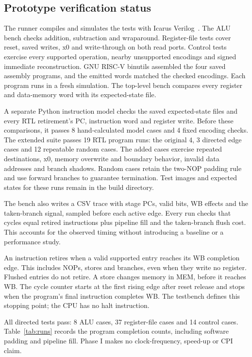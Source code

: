 \documentclass[conference]{IEEEtran}
\begin{document}
\subsection{Prototype verification status}
The runner compiles and simulates the tests with Icarus Verilog~\cite{icarus}. The ALU bench checks addition, subtraction and wraparound. Register-file tests cover reset, saved writes, x0 and write-through on both read ports. Control tests exercise every supported operation, nearby unsupported encodings and signed immediate reconstruction. GNU RISC-V binutils assembled the four saved assembly programs, and the emitted words matched the checked encodings. Each program runs in a fresh simulation. The top-level bench compares every register and data-memory word with its expected-state file.

A separate Python instruction model checks the saved expected-state files and every RTL retirement's PC, instruction word and register write. Before these comparisons, it passes 8 hand-calculated model cases and 4 fixed encoding checks. The extended suite passes 19 RTL program runs: the original 4, 3 directed edge cases and 12 repeatable random cases. The added cases exercise repeated destinations, x0, memory overwrite and boundary behavior, invalid data addresses and branch shadows. Random cases retain the two-NOP padding rule and use forward branches to guarantee termination. Test images and expected states for these runs remain in the build directory.

The bench also writes a CSV trace with stage PCs, valid bits, WB effects and the taken-branch signal, sampled before each active edge. Every run checks that cycles equal retired instructions plus pipeline fill and the taken-branch flush cost. This accounts for the observed timing without introducing a baseline or a performance study.

An instruction retires when a valid supported entry reaches its WB completion edge. This includes NOPs, stores and branches, even when they write no register. Flushed entries do not retire. A store changes memory in MEM, before it reaches WB. The cycle counter starts at the first rising edge after reset release and stops when the program's final instruction completes WB. The testbench defines this stopping point; the CPU has no halt instruction.



All directed tests pass: 8 ALU cases, 37 register-file cases and 14 control cases. Table~\ref{tab:runs} records the program completion counts, including software padding and pipeline fill. Phase I makes no clock-frequency, speed-up or CPI claim.
\end{document}
